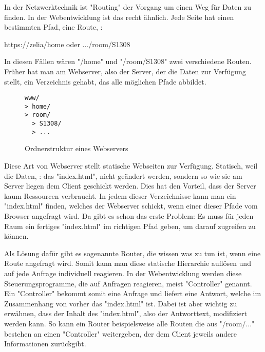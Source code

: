 \label{sec:csrouter}


In der Netzwerktechnik ist "Routing" der Vorgang um einen Weg für Daten zu finden. In der Webentwicklung ist das recht ähnlich. Jede Seite hat einen bestimmten Pfad, eine Route, \zb:

{\ttfamily https://zelia/home} oder {\ttfamily .../room/S1308}

In diesen Fällen wären "{\ttfamily /home}" und "{\ttfamily /room/S1308}" zwei verschiedene Routen. Früher hat man am Webserver, also der Server, der die Daten zur Verfügung stellt, ein Verzeichnis gehabt, das alle möglichen Pfade abbildet.

\begin{figure}[H]
    \begin{lstlisting}
www/
> home/
> room/
  > S1308/
  > ...
    \end{lstlisting}
    \caption{Ordnerstruktur eines Webservers}
\end{figure}

Diese Art von Webserver stellt statische Webseiten zur Verfügung. Statisch, weil die Daten, \zb: das "{\ttfamily index.html}", nicht geändert werden, sondern so wie sie am Server liegen dem Client geschickt werden. Dies hat den Vorteil, dass der Server kaum Ressourcen verbraucht. In jedem dieser Verzeichnisse kann man ein "{\ttfamily index.html}" finden, welches der Webserver schickt, wenn einer dieser Pfade vom Browser angefragt wird. Da gibt es schon das erste Problem: Es muss für jeden Raum ein fertiges "{\ttfamily index.html}" im richtigen Pfad geben, um darauf zugreifen zu können.

Als Lösung dafür gibt es sogenannte Router, die wissen was zu tun ist, wenn eine Route angefragt wird. Somit kann man diese statische Hierarchie auflösen und auf jede Anfrage individuell reagieren. In der Webentwicklung werden diese Steuerungsprogramme, die auf Anfragen reagieren, meist "Controller" genannt. Ein "Controller" bekommt somit eine Anfrage und liefert eine Antwort, welche im Zusammenhang von vorher das "{\ttfamily index.html}" ist. Dabei ist aber wichtig zu erwähnen, dass der Inhalt des "{\ttfamily index.html}", also der Antworttext, modifiziert werden kann. So kann ein Router beispielsweise alle Routen die aus "{\ttfamily /room/...}" bestehen an einen "Controller" weitergeben, der dem Client jeweils andere Informationen zurückgibt.

